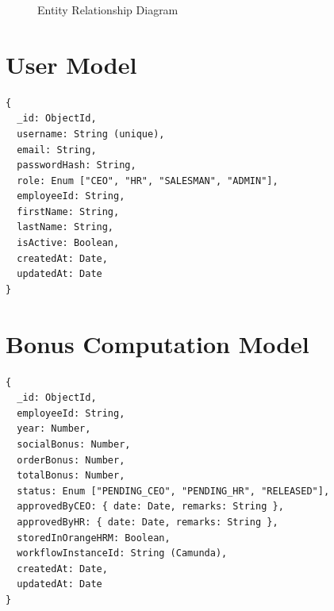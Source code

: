 \documentclass[11pt,a4paper,oneside,openany]{book}
\begin{document}
\begin{figure}[H]
\caption{Entity Relationship Diagram}
\label{fig:erd}
\end{figure}

\section{User Model}

\noindent\begin{minipage}{\linewidth}
\begin{lstlisting}[caption=User Schema Definition]
{
  _id: ObjectId,
  username: String (unique),
  email: String,
  passwordHash: String,
  role: Enum ["CEO", "HR", "SALESMAN", "ADMIN"],
  employeeId: String,
  firstName: String,
  lastName: String,
  isActive: Boolean,
  createdAt: Date,
  updatedAt: Date
}
\end{lstlisting}
\end{minipage}

\section{Bonus Computation Model}

\begin{lstlisting}[caption=BonusComputation Schema]
{
  _id: ObjectId,
  employeeId: String,
  year: Number,
  socialBonus: Number,
  orderBonus: Number,
  totalBonus: Number,
  status: Enum ["PENDING_CEO", "PENDING_HR", "RELEASED"],
  approvedByCEO: { date: Date, remarks: String },
  approvedByHR: { date: Date, remarks: String },
  storedInOrangeHRM: Boolean,
  workflowInstanceId: String (Camunda),
  createdAt: Date,
  updatedAt: Date
}
\end{lstlisting}
\end{document}
